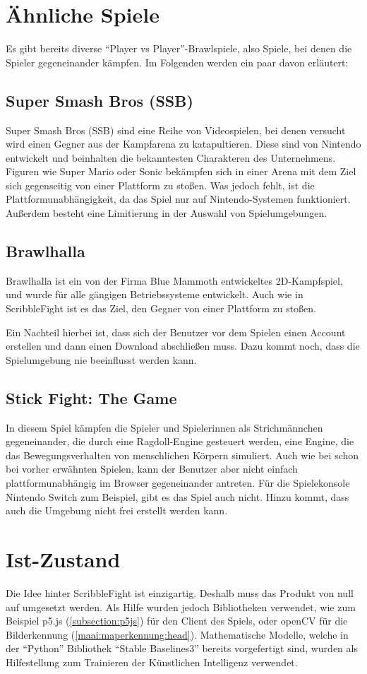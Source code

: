 \section{Ähnliche Spiele}
Es gibt bereits diverse ``Player vs Player''-Brawlspiele, also Spiele, bei denen die Spieler gegeneinander kämpfen. Im Folgenden werden ein paar davon erläutert:

\subsection{Super Smash Bros (SSB)}
Super Smash Bros (SSB) sind eine Reihe von Videospielen, bei denen versucht wird einen Gegner aus der Kampfarena zu katapultieren.
Diese sind von Nintendo entwickelt und beinhalten die bekanntesten Charakteren des Unternehmens.
Figuren wie Super Mario oder Sonic bekämpfen sich in einer Arena mit dem Ziel sich gegenseitig
von einer Plattform zu stoßen.
Was jedoch fehlt, ist die Plattformunabhängigkeit, da das Spiel nur auf Nintendo-Systemen funktioniert.
Außerdem besteht eine Limitierung in der Auswahl von Spielumgebungen. \cite{ssb}

\subsection{Brawlhalla}
Brawlhalla ist ein von der Firma Blue Mammoth entwickeltes 2D-Kampfspiel, und wurde für alle gängigen Betriebssysteme entwickelt.
Auch wie in ScribbleFight ist es das Ziel, den Gegner von einer Plattform zu stoßen. \cite{brawlhalla}

Ein Nachteil hierbei ist, dass sich der Benutzer vor dem Spielen einen Account erstellen
und dann einen Download abschließen muss. Dazu kommt noch, dass die Spielumgebung nie beeinflusst werden kann.

\subsection{Stick Fight: The Game}
In diesem Spiel kämpfen die Spieler und Spielerinnen als Strichmännchen gegeneinander, die durch eine Ragdoll-Engine gesteuert werden, eine Engine, die das Bewegungsverhalten von menschlichen Körpern simuliert.
Auch wie bei schon bei vorher erwähnten Spielen, kann der Benutzer aber nicht einfach plattformunabhängig im Browser gegeneinander antreten.
Für die Spielekonsole Nintendo Switch zum Beispiel, gibt es das Spiel auch nicht. Hinzu kommt, dass auch die Umgebung nicht frei erstellt werden kann. \cite{stickfight}

\section{Ist-Zustand}
Die Idee hinter ScribbleFight ist einzigartig. Deshalb muss das Produkt von null auf umgesetzt werden. Als Hilfe wurden jedoch Bibliotheken verwendet, wie zum Beispiel p5.js (\ref{subsection:p5js}) für den Client des Spiels, oder openCV für die Bilderkennung (\ref{maai:maperkennung:head}).
Mathematische Modelle, welche in der ``Python'' Bibliothek ``Stable Baselines3'' bereits vorgefertigt sind, wurden
als Hilfestellung zum Trainieren der Künstlichen Intelligenz verwendet.